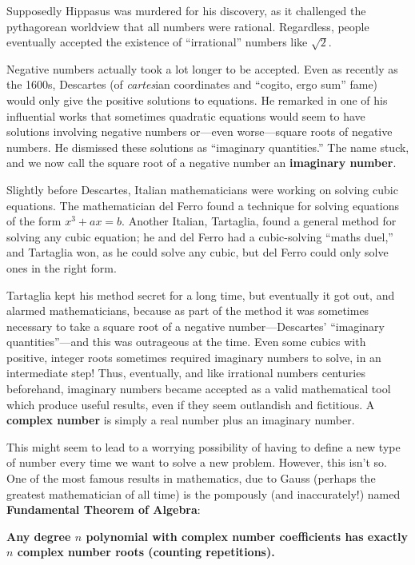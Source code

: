 \documentclass{article}
\begin{document}
Supposedly Hippasus was murdered for his discovery, as it challenged the py\-tha\-g\-orean worldview that all numbers were rational. Regardless, people eventually accepted the existence of ``irrational'' numbers like $\sqrt{2}$.

Negative numbers actually took a lot longer to be accepted. Even as recently as the 1600s, Descartes (of \textit{cartes}ian coordinates and ``cogito, ergo sum'' fame) would only give the positive solutions to equations. He remarked in one of his influential works that sometimes quadratic equations would seem to have solutions involving negative numbers or---even worse---square roots of negative numbers. He dismissed these solutions as ``imaginary quantities.'' The name stuck, and we now call the square root of a negative number an \textbf{imaginary number}.

Slightly before Descartes, Italian mathematicians were working on solving cubic equations. The mathematician del Ferro found a technique for solving equations of the form $x^3+ax=b$. Another Italian, Tartaglia, found a general method for solving any cubic equation; he and del Ferro had a cubic-solving ``maths duel,'' and Tartaglia won, as he could solve any cubic, but del Ferro could only solve ones in the right form.

Tartaglia kept his method secret for a long time, but eventually it got out, and alarmed mathematicians, because as part of the method it was sometimes necessary to take a square root of a negative number---Descartes' ``imaginary quantities''---and this was outrageous at the time. Even some cubics with positive, integer roots sometimes required imaginary numbers to solve, in an intermediate step! Thus, eventually, and like irrational numbers centuries beforehand, imaginary numbers became accepted as a valid mathematical tool which produce useful results, even if they seem outlandish and fictitious. A \textbf{complex number} is simply a real number plus an imaginary number.

This might seem to lead to a worrying possibility of having to define a new type of number every time we want to solve a new problem. However, this isn't so. One of the most famous results in mathematics, due to Gauss (perhaps the greatest mathematician of all time) is the pompously (and inaccurately!) named \textbf{Fundamental Theorem of Algebra}:

\textbf{Any degree $n$ polynomial with complex number coefficients has exactly $n$ complex number roots (counting repetitions).}
\end{document}
